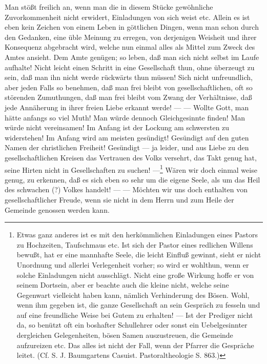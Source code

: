 Man stößt freilich an, wenn man die in diesem Stücke
gewöhnliche Zuvorkommenheit nicht erwidert, Einladungen von sich weist etc. Allein es ist eben kein Zeichen von einem Leben in göttlichen Dingen, wenn man schon durch den Gedanken, eine üble Meinung zu erregen, von derjenigen Weisheit und ihrer Konsequenz abgebracht wird, welche nun einmal alles als Mittel zum Zweck des Amtes ansieht. Dem Amte genügen; so leben, daß man sich nicht selbst im Laufe aufhalte! Nicht leicht einen Schritt in eine Gesellschaft thun, ohne überzeugt zu sein, daß man ihn nicht werde rückwärts thun müssen! Sich nicht unfreundlich, aber jeden Falls so benehmen, daß man frei bleibt von gesellschaftlichen, oft so störenden Zumuthungen, daß man frei bleibt vom Zwang der Verhältnisse, daß jede Annäherung in ihrer freien Liebe erkannt werde! — — Wollte Gott, man hätte anfangs so viel Muth! Man würde dennoch Gleichgesinnte finden! Man würde nicht vereinsamen! Im Anfang ist der Lockung am schwersten zu widerstehen! Im Anfang wird am meisten gesündigt! Gesündigt auf den guten Namen der christlichen Freiheit! Gesündigt — ja leider, und aus Liebe zu den gesellschaftlichen Kreisen das Vertrauen des Volks versehrt, das Takt genug hat, seine Hirten nicht in Gesellschaften zu suchen! —\footnote{Etwas ganz anderes ist es mit den herkömmlichen Einladungen eines Pastors zu Hochzeiten, Taufschmaus etc. Ist sich der Pastor eines redlichen Willens bewußt, hat er eine mannhafte Seele, die leicht Einfluß gewinnt, sieht er nicht Unordnung und allerlei Verlegenheit vorher; so wird er wohlthun, wenn er solche Einladungen nicht ausschlägt. Nicht eine große Wirkung hoffe er von seinem Dortsein, aber er beachte auch die kleine nicht, welche seine Gegenwart vielleicht haben kann, nämlich Verhinderung des Bösen. Wohl, wenn ihm gegeben ist, die ganze Gesellschaft an sein Gespräch zu fesseln und auf eine freundliche Weise bei Gutem zu erhalten! — Ist der Prediger nicht da, so benützt oft ein boshafter Schullehrer oder sonst ein Uebelgesinnter dergleichen Gelegenheiten, bösen Samen auszustreuen, die Gemeinde aufzureizen etc. Das alles ist nicht der Fall, wenn der Pfarrer die Gespräche leitet. (Cf. S. J. Baumgartens Casuist. Pastoraltheologie S. 863.)} Wären wir doch einmal weise genug, zu erkennen,
daß es sich eben so sehr um die eigene Seele, als um das Heil des schwachen (?) Volkes handelt! — — Möchten wir uns doch enthalten von gesellschaftlicher Freude, wenn sie nicht in dem Herrn und zum Heile der Gemeinde genossen werden kann.

